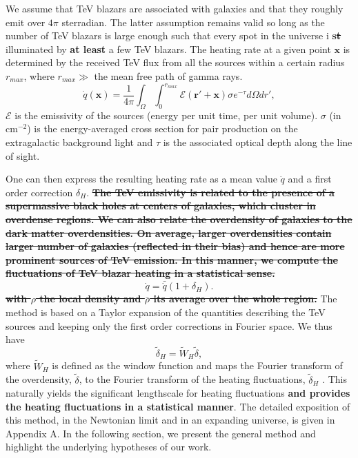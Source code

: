 \documentclass[twocolumns]{emulateapj}
\newcommand\ALc[1]{{\color{red} \bf #1}} %
\begin{document}
{We assume that TeV blazars are associated with galaxies and that they roughly emit over $4\pi$ sterradian.  The latter assumption remains valid so long as the number of TeV blazars is large enough such that every spot in the universe i\ALc{s\sout{t}} illuminated by \ALc{at least} a few TeV blazars. 
The heating rate at a given point $\mathbf{x}$ is determined by the received TeV flux from all the sources within a certain radius $r_{max}$, where $r_{max} \gg $ the mean free path of gamma rays. %
\begin{equation}
\label{eq:heating_rate}
  \dot{q}(\mathbf{x})= \frac{1}{4\pi}  \int_{\Omega}\int_0^{r_{max}}   \mathcal{E}(\mathbf{r}'+\mathbf{x})\sigma  e^{-\tau}d\Omega dr' ,
\end{equation}
$\mathcal{E}$ is the emissivity of the sources (energy per unit time, per unit volume). $\sigma$ (in cm$^{-2}$) is the energy-averaged cross section for pair production on the extragalactic background light and $\tau$ is the associated optical depth along the line of sight. %

One can then express the resulting heating rate as a mean value $\dot{q}$ and a first order correction $\delta_H$. \ALc{\sout{The TeV emissivity is related to the presence of a supermassive black holes at centers of galaxies, which cluster in overdense regions. We can also relate the overdensity of galaxies to the dark matter overdensities.  On average, larger overdensities contain larger number of galaxies (reflected in their bias) and hence are more prominent sources of TeV emission. In this manner, we compute the fluctuations of TeV blazar heating in a statistical sense.}}
\begin{equation}
  \label{eq:delta_h}
  \dot{q}=\bar{\dot{q}}(1+\delta_H).
\end{equation}
\ALc{\sout{with $\rho$ the local density and $\bar{\rho}$ its average over the whole region.}} The method is based on a Taylor expansion of the quantities describing the TeV sources and keeping only the first order corrections in Fourier space.  We thus have
\begin{equation}
  \label{eq:use_window}
  \tilde{\delta}_H=\tilde{W}_H\tilde{\delta},
\end{equation}
where $\tilde{W}_H$ is defined as the window function and maps the Fourier transform of the overdensity, $\tilde{\delta}$, to the Fourier transform of the heating fluctuations, $\tilde{\delta}_H$ . This naturally yields the significant lengthscale for heating fluctuations \ALc{ and provides the heating fluctuations in a statistical manner}.
The detailed exposition of this method, in the Newtonian limit and in an expanding universe, is given in Appendix A. In the following section, we present the general method and highlight the underlying hypotheses of our work.


}
\end{document}
